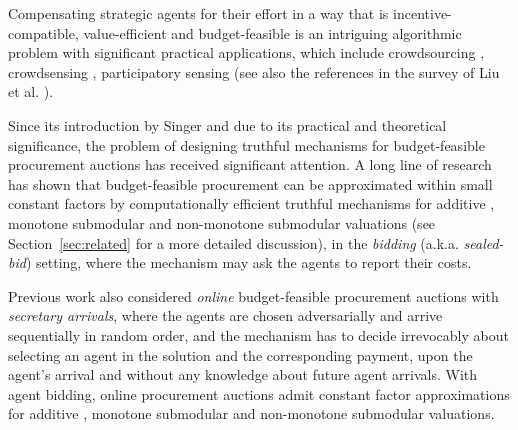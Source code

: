 

Compensating strategic agents for their effort in a way that is incentive-compatible, value-efficient and budget-feasible is an intriguing algorithmic problem with significant practical applications, which include crowdsourcing \cite{SingerM13,SinglaK13,Liu2015}, crowdsensing \cite{Zheng2022}, participatory sensing \cite{Restuccia2016} (see also the references in the survey of Liu et al. \cite{LCLW2024_survey}).

Since its introduction by Singer \cite{Singer10} and due to its practical and theoretical significance, the problem of designing truthful mechanisms for budget-feasible procurement auctions has received significant attention. A long line of research has shown that budget-feasible procurement can be approximated within small constant factors by computationally efficient truthful mechanisms for additive \cite{GravinJLZ2020}, monotone submodular \cite{JalalyT2021,BalkanskiGGST2022} and non-monotone submodular valuations \cite{AmanatidisKS22,BalkanskiGGST2022} (see Section~\ref{sec:related} for a more detailed discussion), in the \emph{bidding} (a.k.a. \emph{sealed-bid}) setting, where the mechanism may ask the agents to report their costs. 

Previous work also considered \emph{online} budget-feasible procurement auctions with \emph{secretary arrivals}, where the agents are chosen adversarially and arrive sequentially in random order, and the mechanism has to decide irrevocably about selecting an agent in the solution and the corresponding payment, upon the agent's arrival and without any knowledge about future agent arrivals. With agent bidding,  online procurement auctions admit constant factor approximations for additive \cite{SingerM13}, monotone submodular \cite{Bada2012} and non-monotone submodular \cite{AmanatidisKS22} valuations. 

